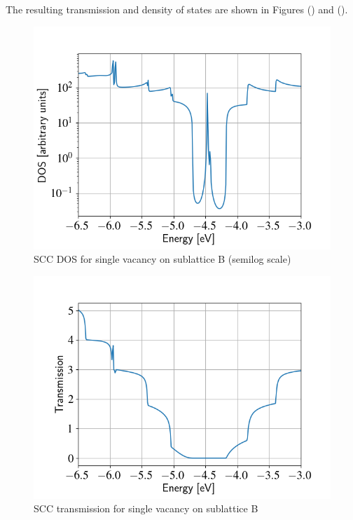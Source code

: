 \documentclass[a4paper,11pt,english]{sphinxmanual}
\begin{document}
{{The resulting transmission and density of states are shown in Figures
{\hyperref[transport:fig-scc-vac2-dos]{\emph{}}} () and {\hyperref[transport:fig-scc-vac2-tunn]{\emph{}}} ().
\begin{figure}[htbp]
\centering
\capstart
\includegraphics[width=0.700\linewidth]{scc-vac2-dos.png}
\caption{SCC DOS for single vacancy on sublattice B (semilog scale)}\label{transport:fig-scc-vac2-dos}\end{figure}
\begin{figure}[htbp]
\centering
\capstart
\includegraphics[width=0.700\linewidth]{scc-vac2-tunn.png}
\caption{SCC transmission for single vacancy on sublattice B}\label{transport:fig-scc-vac2-tunn}\end{figure}

}}
\end{document}
